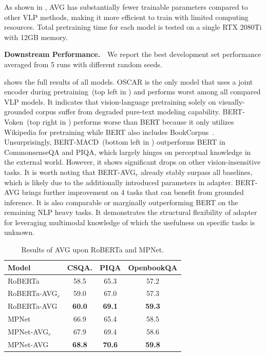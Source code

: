 As shown in , AVG has substantially fewer trainable parameters 
compared to other VLP methods, making it more efficient to train with limited 
computing resources. Total pretraining time for each model is tested on 
a single RTX 2080Ti with 12GB memory.

\textbf{Downstream Performance.}~~We report the best development set performance averaged from 5 runs with different random seeds.


 shows the full results of all models. OSCAR is the only model that uses a joint encoder during pretraining~(top left in ) and performs worst among all compared VLP models. It indicates that vision-language pretraining solely on visually-grounded corpus suffer from degraded pure-text modeling capability. BERT-Voken~(top right in ) performs worse than BERT because it only utilizes Wikipedia for pretraining while BERT also includes BookCorpus~\citep{bookcorpus}. Unsurprisingly, BERT-MACD~(bottom left in ) outperforms BERT in CommonsenseQA and PIQA, which largely hinges on perceptual knowledge in the external world. However, it shows significant drops on other vision-insensitive tasks. It is worth noting that BERT-AVG$_r$ already stably surpass all baselines, which is likely due to the additionally introduced parameters in adapter. BERT-AVG brings further improvement on 4 tasks that can benefit from grounded inference. It is also comparable or marginally outperforming BERT on the remaining NLP heavy tasks. It demonstrates the structural flexibility of adapter for leveraging multimodal knowledge of which the usefulness on specific tasks is unknown.
\begin{table}[t!]
	\centering
	\small
	\begin{tabular}{l|ccc}
		\toprule
		\textbf{Model} & CSQA. & PIQA  &OpenbookQA   \\
		\midrule
		RoBERTa &58.5  &65.3 &57.2   \\
		RoBERTa-AVG$_r$ &59.0 &67.0  &57.3  \\
		RoBERTa-AVG &\textbf{60.0}  &\textbf{69.1} &\textbf{59.3} \\
		\midrule
		MPNet &66.9  & 65.4  &58.5  \\
		MPNet-AVG$_r$ &67.9  &69.4  &58.6 \\
		MPNet-AVG &\textbf{68.8}  &\textbf{70.6}  &\textbf{59.8} \\
		\bottomrule
	\end{tabular}
	\caption{Results of AVG upon RoBERTa and MPNet.}
	\label{table:rm}
\end{table}

